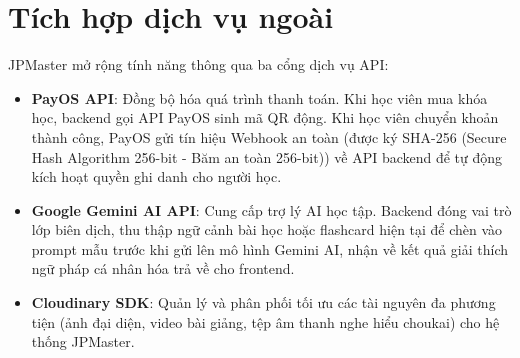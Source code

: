 \documentclass[../DoAn.tex]{subfiles}
\begin{document}
\section{Tích hợp dịch vụ ngoài}
\label{section:3.4}

JPMaster mở rộng tính năng thông qua ba cổng dịch vụ API:
\begin{itemize}
    \item \textbf{PayOS API}: Đồng bộ hóa quá trình thanh toán. Khi học viên mua khóa học, backend gọi API PayOS sinh mã QR động. Khi học viên chuyển khoản thành công, PayOS gửi tín hiệu Webhook an toàn (được ký SHA-256 (Secure Hash Algorithm 256-bit - Băm an toàn 256-bit)) về API backend để tự động kích hoạt quyền ghi danh cho người học.
    \item \textbf{Google Gemini AI API}: Cung cấp trợ lý AI học tập. Backend đóng vai trò lớp biên dịch, thu thập ngữ cảnh bài học hoặc flashcard hiện tại để chèn vào prompt mẫu trước khi gửi lên mô hình Gemini AI, nhận về kết quả giải thích ngữ pháp cá nhân hóa trả về cho frontend.
    \item \textbf{Cloudinary SDK}: Quản lý và phân phối tối ưu các tài nguyên đa phương tiện (ảnh đại diện, video bài giảng, tệp âm thanh nghe hiểu choukai) cho hệ thống JPMaster.
\end{itemize}
\end{document}
